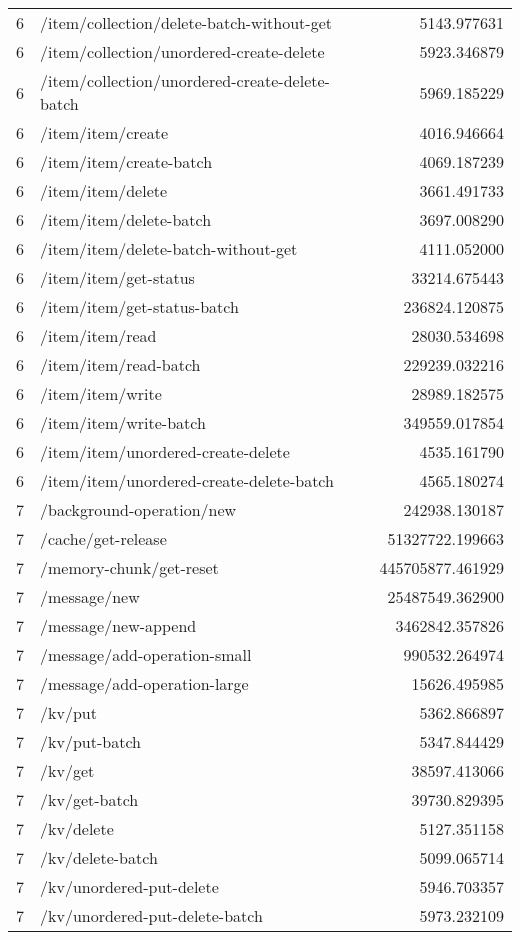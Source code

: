 \begin{longtable}{rlr}
6 & /item/collection/delete-batch-without-get & 5143.977631 \\
6 & /item/collection/unordered-create-delete & 5923.346879 \\
6 & /item/collection/unordered-create-delete-batch & 5969.185229 \\
6 & /item/item/create & 4016.946664 \\
6 & /item/item/create-batch & 4069.187239 \\
6 & /item/item/delete & 3661.491733 \\
6 & /item/item/delete-batch & 3697.008290 \\
6 & /item/item/delete-batch-without-get & 4111.052000 \\
6 & /item/item/get-status & 33214.675443 \\
6 & /item/item/get-status-batch & 236824.120875 \\
6 & /item/item/read & 28030.534698 \\
6 & /item/item/read-batch & 229239.032216 \\
6 & /item/item/write & 28989.182575 \\
6 & /item/item/write-batch & 349559.017854 \\
6 & /item/item/unordered-create-delete & 4535.161790 \\
6 & /item/item/unordered-create-delete-batch & 4565.180274 \\
7 & /background-operation/new & 242938.130187 \\
7 & /cache/get-release & 51327722.199663 \\
7 & /memory-chunk/get-reset & 445705877.461929 \\
7 & /message/new & 25487549.362900 \\
7 & /message/new-append & 3462842.357826 \\
7 & /message/add-operation-small & 990532.264974 \\
7 & /message/add-operation-large & 15626.495985 \\
7 & /kv/put & 5362.866897 \\
7 & /kv/put-batch & 5347.844429 \\
7 & /kv/get & 38597.413066 \\
7 & /kv/get-batch & 39730.829395 \\
7 & /kv/delete & 5127.351158 \\
7 & /kv/delete-batch & 5099.065714 \\
7 & /kv/unordered-put-delete & 5946.703357 \\
7 & /kv/unordered-put-delete-batch & 5973.232109 \\

\end{longtable}
